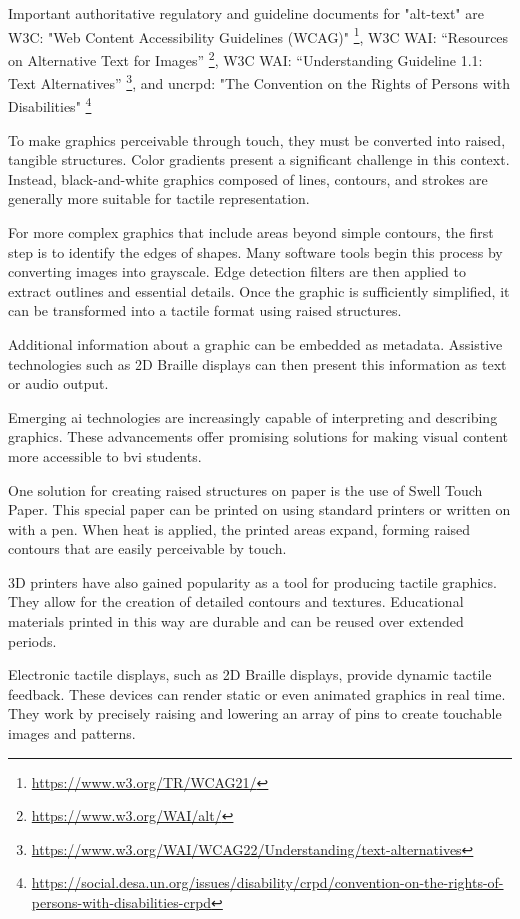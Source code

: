 Important authoritative regulatory and guideline documents for "alt-text" are  W3C: "Web Content Accessibility Guidelines (WCAG)" \footnote{\url{https://www.w3.org/TR/WCAG21/}}, W3C WAI: “Resources on Alternative Text for Images” \footnote{\url{https://www.w3.org/WAI/alt/}}, W3C WAI: “Understanding Guideline 1.1: Text Alternatives” \footnote{\url{https://www.w3.org/WAI/WCAG22/Understanding/text-alternatives}}, and \ac{uncrpd}: "The Convention on the Rights of Persons with Disabilities"  \footnote{\url{https://social.desa.un.org/issues/disability/crpd/convention-on-the-rights-of-persons-with-disabilities-crpd}}


To make graphics perceivable through touch, they must be converted into raised, tangible structures. 
Color gradients present a significant challenge in this context. Instead, black-and-white graphics composed of lines, contours, and strokes are generally more suitable for tactile representation.

For more complex graphics that include areas beyond simple contours, the first step is to identify the edges of shapes. Many software tools begin this process by converting images into grayscale. Edge detection filters are then applied to extract outlines and essential details. Once the graphic is sufficiently simplified, it can be transformed into a tactile format using raised structures.

Additional information about a graphic can be embedded as metadata. Assistive technologies such as 2D Braille displays can then present this information as text or audio output.

Emerging \ac{ai} technologies are increasingly capable of interpreting and describing graphics. These advancements offer promising solutions for making visual content more accessible to \ac{bvi} students.

One solution for creating raised structures on paper is the use of Swell Touch Paper. This special paper can be printed on using standard printers or written on with a pen. When heat is applied, the printed areas expand, forming raised contours that are easily perceivable by touch.

3D printers have also gained popularity as a tool for producing tactile graphics. They allow for the creation of detailed contours and textures. Educational materials printed in this way are durable and can be reused over extended periods.

Electronic tactile displays, such as 2D Braille displays, provide dynamic tactile feedback. These devices can render static or even animated graphics in real time. They work by precisely raising and lowering an array of pins to create touchable images and patterns.



